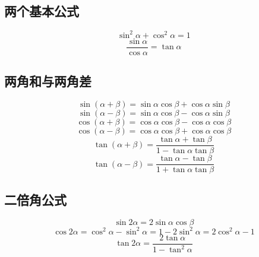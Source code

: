 
\begin{issues}
\issueDraft
\end{issues}

\subsection{两个基本公式}
\begin{equation}
\sin^2\alpha + \cos^2\alpha = 1
\end{equation}
\begin{equation}
\frac{\sin\alpha}{\cos\alpha} = \tan\alpha
\end{equation}

\subsection{两角和与两角差}
\begin{equation}
\sin(\alpha + \beta) = \sin\alpha \cos\beta + \cos\alpha \sin\beta
\end{equation}
\begin{equation}
\sin(\alpha - \beta) = \sin\alpha \cos\beta - \cos\alpha \sin\beta
\end{equation}
\begin{equation}
\cos(\alpha + \beta) = \cos\alpha \cos\beta - \cos\alpha \cos\beta
\end{equation}
\begin{equation}
\cos(\alpha - \beta) = \cos\alpha \cos\beta + \cos\alpha \cos\beta
\end{equation}
\begin{equation}
\tan(\alpha + \beta) = \frac{\tan\alpha+\tan\beta}{1-\tan\alpha \tan\beta}
\end{equation}
\begin{equation}
\tan(\alpha - \beta) = \frac{\tan\alpha - \tan\beta}{1+\tan\alpha \tan\beta}
\end{equation}

\subsection{二倍角公式}
\begin{equation}
\sin2\alpha = 2\sin\alpha \cos\beta
\end{equation}
\begin{equation}
\cos2\alpha = \cos^2\alpha - \sin^2\alpha = 1 - 2\sin^2\alpha = 2\cos^2\alpha -1
\end{equation}
\begin{equation}
\tan2\alpha = \frac{2\tan\alpha}{1-\tan^2\alpha}
\end{equation}

